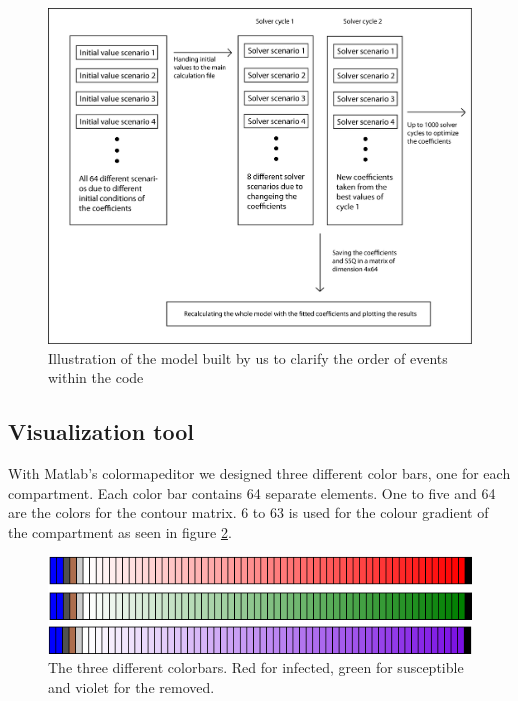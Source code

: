 \documentclass[11pt]{article}
\begin{document}
\begin{center}
\begin{figure}
\includegraphics[scale=.6]{Bilder/Matlab_program.png}
\caption{Illustration of the model built by us to clarify the order of events within the code}
\label{pic:sir_flow_our}
\end{figure}
\end{center}



\subsection{Visualization tool}
With Matlab’s colormapeditor we designed three different color bars, one for each compartment. Each color bar contains 64 separate elements. One to five and 64 are the colors for the contour matrix. 6 to 63 is used for the colour gradient of the compartment as seen in figure \ref{fig:colorbar}.

\begin{figure}
  \begin{minipage}[t]{\textwidth}
    \centering
    \includegraphics[width=\textwidth]{Bilder/colorbar.png} 
    \caption{The three different colorbars. Red for infected, green for susceptible and violet for the removed.}
	\label{fig:colorbar}
  \end{minipage}
\end{figure}
\end{document}
